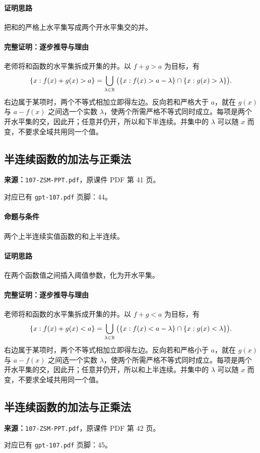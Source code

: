 \paragraph{证明思路}把和的严格上水平集写成两个开水平集交的并。
\paragraph{完整证明：逐步推导与理由}
老师将和函数的水平集拆成开集的并。以 $f+g>a$ 为目标，有
\[\{x:f(x)+g(x)>a\}=\bigcup_{\lambda\in\mathbb{R}}\big(\{x:f(x)>a-\lambda\}\cap\{x:g(x)>\lambda\}\big).\]
右边属于某项时，两个不等式相加立即得左边。反向若和严格大于 $a$，就在 $g(x)$ 与 $a-f(x)$ 之间选一个实数 $\lambda$，使两个所需严格不等式同时成立。每项是两个开水平集的交，因此开；任意并仍开，所以和下半连续。并集中的 $\lambda$ 可以随 $x$ 而变，不要求全域共用同一个值。
\clearpage\subsection{半连续函数的加法与正乘法}
\textbf{来源：}\texttt{107-ZSM-PPT.pdf}，原课件 PDF 第 41 页。\par
对应已有 \texttt{gpt-107.pdf} 页脚：44。\par
\paragraph{命题与条件}两个上半连续实值函数的和上半连续。
\paragraph{证明思路}在两个函数值之间插入阈值参数，化为开水平集。
\paragraph{完整证明：逐步推导与理由}
老师将和函数的水平集拆成开集的并。以 $f+g<a$ 为目标，有
\[\{x:f(x)+g(x)<a\}=\bigcup_{\lambda\in\mathbb{R}}\big(\{x:f(x)<a-\lambda\}\cap\{x:g(x)<\lambda\}\big).\]
右边属于某项时，两个不等式相加立即得左边。反向若和严格小于 $a$，就在 $g(x)$ 与 $a-f(x)$ 之间选一个实数 $\lambda$，使两个所需严格不等式同时成立。每项是两个开水平集的交，因此开；任意并仍开，所以和上半连续。并集中的 $\lambda$ 可以随 $x$ 而变，不要求全域共用同一个值。
\clearpage\subsection{半连续函数的加法与正乘法}
\textbf{来源：}\texttt{107-ZSM-PPT.pdf}，原课件 PDF 第 42 页。\par
对应已有 \texttt{gpt-107.pdf} 页脚：45。\par
